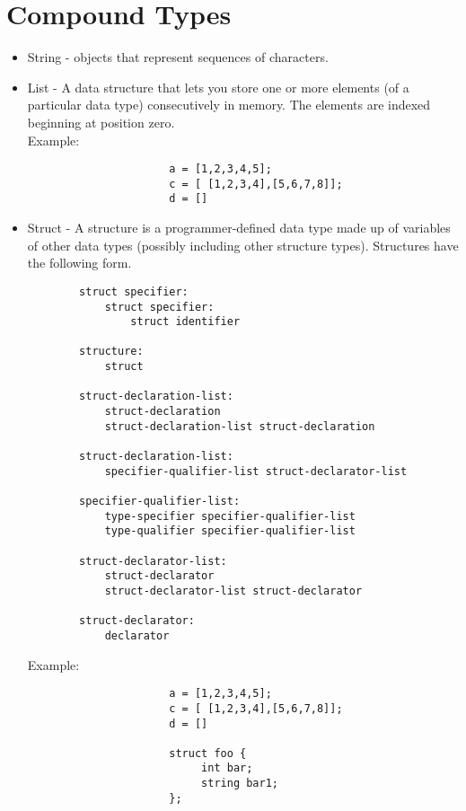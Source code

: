 \documentclass[./LRM_main.tex]{subfiles}
\begin{document}
\section{Compound Types}
\begin{itemize}
    \item String - objects that represent sequences of characters. 
    \item List - A data structure that lets you store one or more elements (of a particular data type) consecutively in memory. The elements are indexed beginning at position zero. 
    \\Example:

\begin{lstlisting}
                      a = [1,2,3,4,5];
		              c = [ [1,2,3,4],[5,6,7,8]];
		              d = []
\end{lstlisting}
    \item Struct - A structure is a programmer-defined data type made up of variables of other data types (possibly including other structure types). Structures have the following form.
    \begin{lstlisting}
        struct specifier:
            struct specifier:
                struct identifier
                
        structure:
            struct
            
        struct-declaration-list:
            struct-declaration
            struct-declaration-list struct-declaration
        
        struct-declaration-list:
            specifier-qualifier-list struct-declarator-list
        
        specifier-qualifier-list:
            type-specifier specifier-qualifier-list
            type-qualifier specifier-qualifier-list
        
        struct-declarator-list:
            struct-declarator
            struct-declarator-list struct-declarator
        
        struct-declarator:
            declarator
  \end{lstlisting}
 Example:
        \begin{lstlisting}
                      a = [1,2,3,4,5];
		              c = [ [1,2,3,4],[5,6,7,8]];
		              d = []
		              
		              struct foo {
			               int bar;
			               string bar1;
                      };

\end{lstlisting}
        


\end{itemize}
\end{document}
